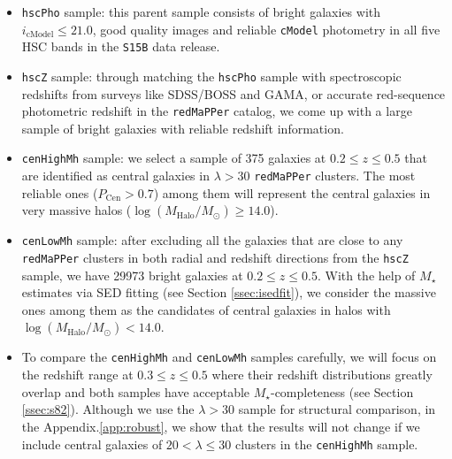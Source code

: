 \documentclass{emulateapj}
\def\redm{\texttt{redMaPPer}}
\def\rbcg{\texttt{cenHighMh}}
\def\nbcg{\texttt{cenLowMh}}
\def\mstar{{$M_{\star}$}}
\def\logmh{{$\log (M_{\mathrm{Halo}}/M_{\odot})$}}
\newcommand{\update}[1]{\textcolor{Bittersweet}{#1}}
\begin{document}
\begin{CJK*}{UTF8}{gbsn}
    \begin{itemize}
        \item \texttt{hscPho} sample: this parent sample consists of bright galaxies 
            with $i_{\mathrm{cModel}} \leq 21.0$, good quality images and reliable 
            \texttt{cModel} photometry in all five HSC bands in the \texttt{S15B} 
            data release. 
        \item \texttt{hscZ} sample: through matching the \texttt{hscPho} sample with 
            spectroscopic redshifts from surveys like SDSS/BOSS and GAMA, or accurate 
            red-sequence photometric redshift in the \redm{} catalog, we come up with 
            a large sample of bright galaxies with reliable redshift information. 
        \item \rbcg{} sample: we select a sample of 375 galaxies at $0.2 \leq z \leq 0.5$
            that are identified as central galaxies in $\lambda > 30$ \redm{} clusters. 
            The most reliable ones ($P_{\mathrm{Cen}} >0.7$) among 
            them will represent the central galaxies in very massive halos
            (\logmh{}$\geq 14.0$). 
        \item \nbcg{} sample: after excluding all the galaxies that are close to any 
            \redm{} clusters in both radial and redshift directions from the 
            \texttt{hscZ} sample, we have 29973 bright galaxies at $0.2 \leq z \leq 0.5$.
            With the help of \mstar{} estimates via SED fitting (see Section 
            \ref{ssec:isedfit}), we consider the massive ones among them as the 
            candidates of central galaxies in halos with \logmh{}$<14.0$.  
        \item To compare the \rbcg{} and \nbcg{} samples carefully, we will focus on 
            the redshift range at $0.3 \leq z \leq 0.5$ where their redshift 
            distributions greatly overlap and both samples have acceptable
            \mstar-completeness (see Section \ref{ssec:s82}).  
            \update{Although we use the $\lambda > 30$ sample for structural comparison, 
            in the Appendix.\ref{app:robust}, we show that the results will not change 
            if we include central galaxies of $20 < \lambda \leq 30$ clusters in the 
            \rbcg{} sample.}
    \end{itemize}




\end{CJK*}
\end{document}

